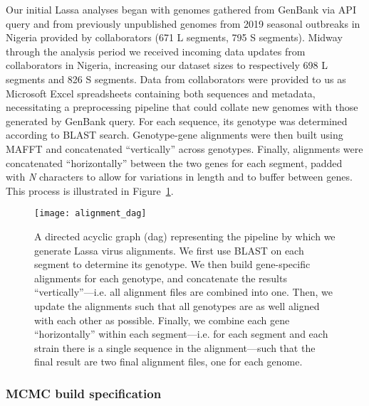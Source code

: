 Our initial Lassa analyses began with genomes gathered from GenBank via API query and from previously unpublished genomes from 2019 seasonal outbreaks in Nigeria provided by collaborators (671 L segments, 795 S segments)\cite{kafetzopoulou2019metagenomic}.
Midway through the analysis period we received incoming data updates from collaborators in Nigeria, increasing our dataset sizes to respectively 698 L segments and 826 S segments.
Data from collaborators were provided to us as Microsoft Excel spreadsheets containing both sequences and metadata, necessitating a preprocessing pipeline that could collate new genomes with those generated by GenBank query.
For each sequence, its genotype was determined according to BLAST\cite{boratyn2013blast} search.
Genotype-gene alignments were then built using MAFFT and concatenated ``vertically'' across genotypes\cite{katoh2013mafft}.
Finally, alignments were concatenated ``horizontally'' between the two genes for each segment, padded with \textit{N} characters to allow for variations in length and to buffer between genes.
This process is illustrated in Figure~\ref{fig:alignment_dag}.

\begin{figure}[ht]
  \centering
  \medskip
  \texttt{[image: alignment\_dag]}
  \caption[Lassa alignment pipeline]{A directed acyclic graph (\gls{dag}) representing the pipeline by which we generate Lassa virus alignments. We first use BLAST on each segment to determine its genotype. We then build gene-specific alignments for each genotype, and concatenate the results ``vertically''---i.e. all alignment files are combined into one. Then, we update the alignments such that all genotypes are as well aligned with each other as possible. Finally, we combine each gene ``horizontally'' within each segment---i.e. for each segment and each strain there is a single sequence in the alignment---such that the final result are two final alignment files, one for each genome.}
  \label{fig:alignment_dag}
\end{figure}

\subsubsection{MCMC build specification}

